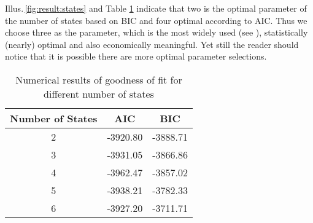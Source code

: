 Illus.\,\ref{fig:result:states} and Table \ref{table:result:states} indicate that 
two is the optimal parameter of 
the number of states based on BIC and four optimal according to AIC.
Thus we choose three as the parameter, 
which is the most widely used (see \cite{Zucchini:2009df,Dias:2015ky,Nystrup:2015ic}),
statistically (nearly) optimal and also economically meaningful.
Yet still the reader should notice that it is possible there are more optimal parameter selections.

        \begin{table}[!hbt]
        \center
        \caption{Numerical results of goodness of fit for different number of states}
        \label{table:result:states}
        \begin{tabular}{c c c}
        \hline
        Number of States  &  \hspace*{5em}AIC\hspace*{5em}  &  \hspace*{5em}BIC\hspace*{5em} \\
        \hline
        2   &   -3920.80    &   -3888.71    \\
        3   &   -3931.05    &   -3866.86    \\
        4   &   -3962.47    &   -3857.02    \\
        5   &   -3938.21    &   -3782.33    \\
        6   &   -3927.20    &   -3711.71    \\
        \hline
        \end{tabular}
        \end{table}

